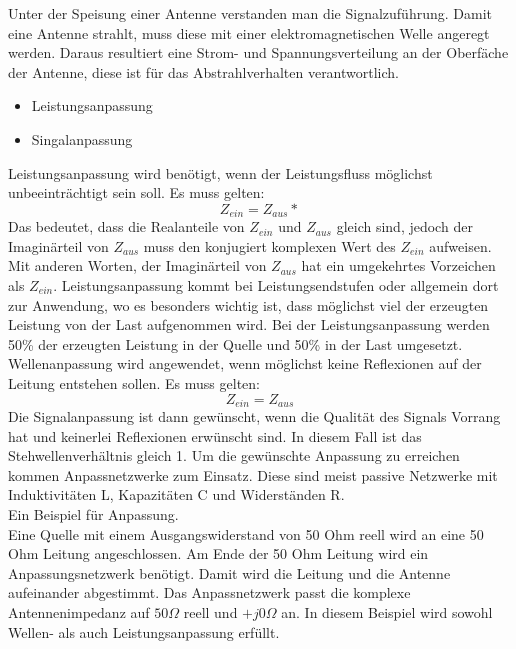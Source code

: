 Unter der Speisung einer Antenne verstanden man die Signalzuführung. Damit eine Antenne strahlt, muss diese mit einer elektromagnetischen Welle angeregt werden. Daraus resultiert eine Strom- und Spannungsverteilung an der Oberfäche der Antenne, diese ist für das Abstrahlverhalten verantwortlich. 
\begin{itemize}
\item 	Leistungsanpassung
\item 	Singalanpassung
\end{itemize}
Leistungsanpassung wird benötigt, wenn der Leistungsfluss möglichst unbeeinträchtigt sein soll. Es muss gelten:
\[Z_{ein}=Z_{aus}*\]
Das bedeutet, dass die Realanteile von $Z_{ein}$ und $Z_{aus}$ gleich sind, jedoch der Imaginärteil von $Z_{aus}$ muss den konjugiert komplexen Wert des $Z_{ein}$ aufweisen. Mit anderen Worten, der Imaginärteil von $Z_{aus}$ hat ein umgekehrtes Vorzeichen als $Z_{ein}$. Leistungsanpassung kommt bei Leistungsendstufen oder allgemein dort zur Anwendung, wo es besonders wichtig ist, dass möglichst viel der erzeugten Leistung von der Last aufgenommen wird. Bei der Leistungsanpassung werden  50\% der erzeugten Leistung in  der Quelle  und 50\% in der Last umgesetzt.
Wellenanpassung wird angewendet, wenn möglichst keine Reflexionen auf der Leitung entstehen sollen. Es muss gelten:
\[Z_{ein}=Z_{aus}\]
Die Signalanpassung ist dann gewünscht, wenn die Qualität des Signals Vorrang hat und keinerlei Reflexionen erwünscht sind. In diesem Fall ist das Stehwellenverhältnis gleich 1.
Um die  gewünschte Anpassung zu erreichen kommen Anpassnetzwerke zum Einsatz. Diese sind meist passive Netzwerke mit Induktivitäten L, Kapazitäten C und Widerständen R.\\
Ein Beispiel für Anpassung.\\
Eine Quelle mit einem Ausgangswiderstand von  50 Ohm reell wird an eine 50 Ohm Leitung angeschlossen. Am Ende der 50 Ohm Leitung wird ein  Anpassungsnetzwerk benötigt. Damit wird die Leitung und die Antenne aufeinander abgestimmt. Das Anpassnetzwerk passt die komplexe Antennenimpedanz auf $50\Omega$ reell und $+j0\Omega$ an. In diesem Beispiel wird sowohl Wellen- als auch Leistungsanpassung erfüllt.\\


